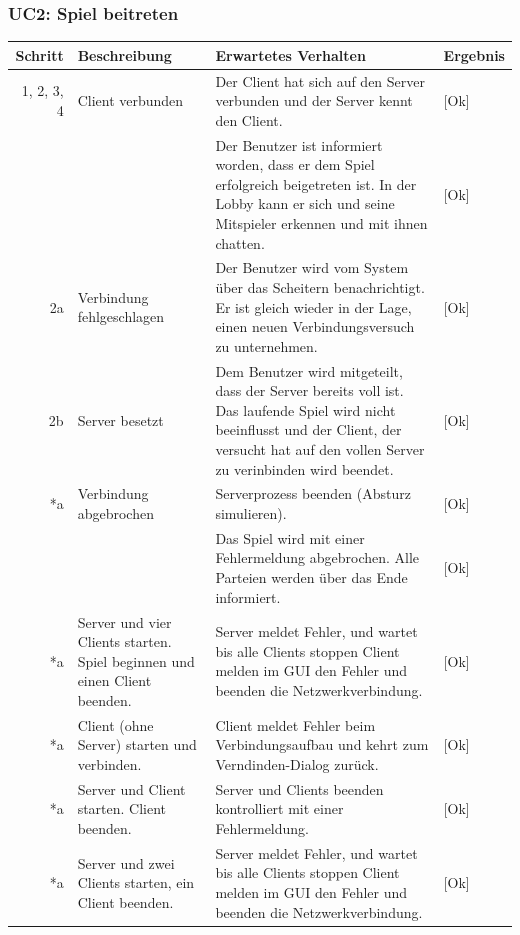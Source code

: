 \documentclass[12pt,halfparskip]{scrartcl}
\begin{document}
\newpage

\subsubsection{UC2: Spiel beitreten}
	\begin {tabular}{r | p{3cm} | p{8cm} | l}
		\toprule
		\textbf{Schritt} & \textbf{Beschreibung} & \textbf{Erwartetes Verhalten} & \textbf{Ergebnis} \\
		\midrule
		1, 2, 3, 4 & Client verbunden & Der Client hat sich auf den Server verbunden und der Server kennt den Client. & [Ok] \\
		 \cline{3-4} & & Der Benutzer ist informiert worden, dass er dem Spiel erfolgreich beigetreten ist. In der Lobby kann er sich und seine Mitspieler erkennen und mit ihnen chatten. & [Ok] \\
		\midrule
		2a & Verbindung fehlgeschlagen & Der Benutzer wird vom System über das Scheitern benachrichtigt. Er ist gleich wieder in der Lage, einen neuen Verbindungsversuch zu unternehmen. & [Ok] \\
		\midrule
		2b & Server besetzt & Dem Benutzer wird mitgeteilt, dass der Server bereits voll ist. Das laufende Spiel wird nicht beeinflusst und der Client, der versucht hat auf den vollen Server zu verinbinden wird beendet. & [Ok] \\
		\midrule
		*a & Verbindung abgebrochen & Serverprozess beenden (Absturz simulieren). & [Ok]  \\
		\cline{3-4} & & Das Spiel wird mit einer Fehlermeldung abgebrochen. Alle Parteien werden über das Ende informiert. & [Ok] \\
		\midrule
		*a & Server und vier Clients starten. Spiel beginnen und einen Client beenden. & Server meldet Fehler, und wartet bis alle Clients stoppen Client melden im GUI den Fehler und beenden die Netzwerkverbindung. & [Ok] \\
		\midrule
		*a & Client (ohne Server) starten und verbinden. & Client meldet Fehler beim Verbindungsaufbau und kehrt zum Verndinden-Dialog zurück. & [Ok] \\
		\midrule
		*a & Server und Client starten. Client beenden. & Server und Clients beenden kontrolliert mit einer Fehlermeldung. & [Ok] \\
		\midrule
		*a & Server und zwei Clients starten, ein Client beenden. & Server meldet Fehler, und wartet bis alle Clients stoppen Client melden im GUI den Fehler und beenden die Netzwerkverbindung. & [Ok]  \\
		\bottomrule
	\end{tabular}
	
\end{document}
